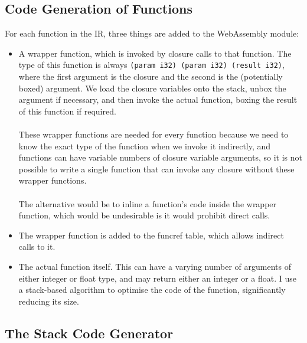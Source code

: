 \documentclass[12pt,twoside,notitlepage]{report}
\newcommand{\wainline}{\texttt}
\newcommand{\cfbox}[2]{%
	\colorlet{currentcolor}{.}%
	{\color{#1}%
		\fbox{\color{currentcolor}#2}}%
}
\newcommand\note[1]{\noindent\cfbox{blue}{\parbox{\textwidth}{\textcolor{blue}{#1}}}}
\begin{document}
\subsection{Code Generation of Functions}
For each function in the IR, three things are added to the WebAssembly module:
\begin{itemize}
	\item A wrapper function, which is invoked by closure calls to that function. The type of this function is always \wainline{(param i32) (param i32) (result i32)}, where the first argument is the closure and the second is the (potentially boxed) argument. We load the closure variables onto the stack, unbox the argument if necessary, and then invoke the actual function, boxing the result of this function if required.
	\\\\
	These wrapper functions are needed for every function because we need to know the exact type of the function when we invoke it indirectly, and functions can have variable numbers of closure variable arguments, so it is not possible to write a single function that can invoke any closure without these wrapper functions.
	\\\\
	The alternative would be to inline a function's code inside the wrapper function, which would be undesirable is it would prohibit direct calls.
	\item The wrapper function is added to the funcref table, which allows indirect calls to it.
	\item The actual function itself. This can have a varying number of arguments of either integer or float type, and may return either an integer or a float. I use a stack-based algorithm to optimise the code of the function, significantly reducing its size.
\end{itemize}

\subsection{The Stack Code Generator}
%
\end{document}
